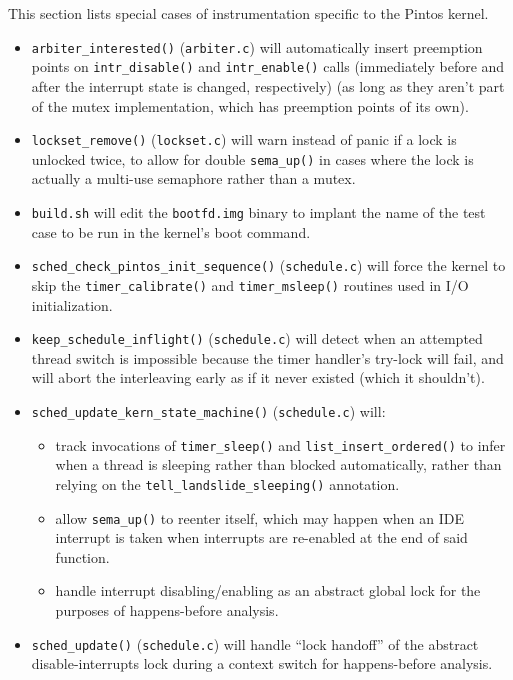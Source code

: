 This section lists special cases of instrumentation specific to the Pintos kernel.

\begin{itemize}
	\item {\tt arbiter\_interested()} ({\tt arbiter.c})
		will automatically insert preemption points on {\tt intr\_disable()} and {\tt intr\_enable()} calls
		(immediately before and after the interrupt state is changed, respectively)
		(as long as they aren't part of the mutex implementation, which has preemption points of its own).
	\item {\tt lockset\_remove()} ({\tt lockset.c})
		will warn instead of panic if a lock is unlocked twice,
		to allow for double {\tt sema\_up()} in cases where the lock is actually a multi-use semaphore rather than a mutex.
	\item {\tt build.sh} will edit the {\tt bootfd.img} binary to implant the name of the test case to be run in the kernel's boot command.
	\item {\tt sched\_check\_pintos\_init\_sequence()} ({\tt schedule.c})
		will force the kernel to skip the {\tt timer\_calibrate()} and {\tt timer\_msleep()} routines
		used in I/O initialization.
	\item {\tt keep\_schedule\_inflight()} ({\tt schedule.c})
		will detect when an attempted thread switch is impossible
		because the timer handler's try-lock will fail,
		and will abort the interleaving early as if it never existed (which it shouldn't).
	\item {\tt sched\_update\_kern\_state\_machine()} ({\tt schedule.c})
		will:
		\begin{itemize}
			\item track invocations of {\tt timer\_sleep()} and {\tt list\_insert\_ordered()}
				to infer when a thread is sleeping rather than blocked automatically,
				rather than relying on the {\tt tell\_landslide\_sleeping()} annotation.
			\item allow {\tt sema\_up()} to reenter itself,
				which may happen when an IDE interrupt is taken when interrupts are re-enabled at the end of said function.
			\item handle interrupt disabling/enabling as an abstract global lock for the purposes of happens-before analysis.
		\end{itemize}
	\item {\tt sched\_update()} ({\tt schedule.c})
		will handle ``lock handoff'' of the abstract disable-interrupts lock
		during a context switch for happens-before analysis.

\end{itemize}
